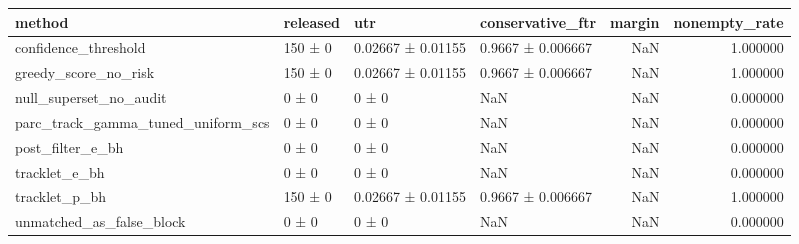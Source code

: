 \begin{tabular}{llllrr}
\toprule
method & released & utr & conservative_ftr & margin & nonempty_rate \\
\midrule
confidence_threshold & 150 ± 0 & 0.02667 ± 0.01155 & 0.9667 ± 0.006667 & NaN & 1.000000 \\
greedy_score_no_risk & 150 ± 0 & 0.02667 ± 0.01155 & 0.9667 ± 0.006667 & NaN & 1.000000 \\
null_superset_no_audit & 0 ± 0 & 0 ± 0 & NaN & NaN & 0.000000 \\
parc_track_gamma_tuned_uniform_scs & 0 ± 0 & 0 ± 0 & NaN & NaN & 0.000000 \\
post_filter_e_bh & 0 ± 0 & 0 ± 0 & NaN & NaN & 0.000000 \\
tracklet_e_bh & 0 ± 0 & 0 ± 0 & NaN & NaN & 0.000000 \\
tracklet_p_bh & 150 ± 0 & 0.02667 ± 0.01155 & 0.9667 ± 0.006667 & NaN & 1.000000 \\
unmatched_as_false_block & 0 ± 0 & 0 ± 0 & NaN & NaN & 0.000000 \\
\bottomrule
\end{tabular}
